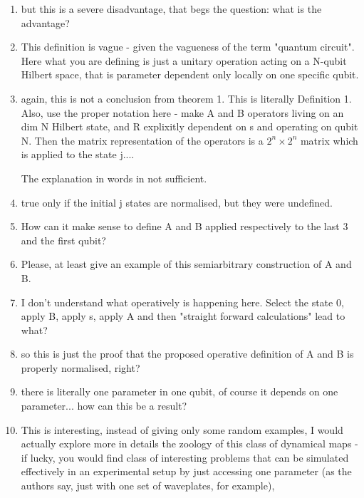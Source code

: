 \documentclass[10pt,letterpaper]{article} %
\begin{document}
\begin{enumerate}
\item but this is a severe disadvantage, that begs the question: what is the advantage? \\

\item This definition is vague - given the vagueness of the term "quantum circuit".
 Here what you are defining is just a unitary operation acting on a N-qubit Hilbert space, that is parameter dependent only locally on one specific qubit. 
 
\item again, this is not a conclusion from theorem 1. This is literally Definition 1. Also, use the proper notation here - make A and B operators living on an dim N Hilbert state, and R explixitly dependent on s and operating on qubit N. Then the matrix representation of the operators is a $2^n\times 2^n$ matrix which is applied to the state j....


The explanation in words in not sufficient.

\item true only if the initial j states are normalised, but they were undefined.


\item How can it make sense to define A and B applied respectively to the last 3 and the first qubit?

\item  Please, at least give an example of this semiarbitrary construction of A and B.

\item I don't understand what operatively is happening here. Select the state 0, apply B, apply s, apply A and then "straight forward calculations" lead to what?

\item so this is just the proof that the proposed operative definition of A and B is properly normalised, right?

\item there is literally one parameter in one qubit, of course it depends on one parameter...
 how can this be a result?
  
 \item This is interesting, instead of giving only some random examples, I would actually explore more in details the zoology of this class of dynamical maps - if lucky, you would find class of interesting problems that can be simulated effectively in an experimental setup by just accessing one parameter (as the authors say, just with one set of waveplates, for example), 
 

\end{enumerate}
\end{document}

